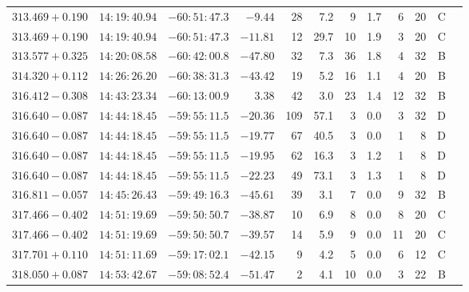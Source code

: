 {\begin{longtable}{c rrr rrrrr rr c}
    $313.469+0.190$     &   $14:19:40.94$     &   $-60:51:47.3$     &   $-9.44   $    &   28     &    7.2    &    9   &   1.7 &   6   &   20  &   C   \\
    $313.469+0.190$     &   $14:19:40.94$     &   $-60:51:47.3$     &   $-11.81  $    &   12     &   29.7    &    10  &   1.9 &   3   &   20  &   C   \\
    $313.577+0.325$     &   $14:20:08.58$     &   $-60:42:00.8$     &   $-47.80  $    &   32     &    7.3    &    36  &   1.8 &   4   &   32  &   B   \\
    $314.320+0.112$     &   $14:26:26.20$     &   $-60:38:31.3$     &   $-43.42  $    &   19     &    5.2    &    16  &   1.1 &   4   &   20  &   B   \\
    $316.412-0.308$     &   $14:43:23.34$     &   $-60:13:00.9$     &   $3.38    $    &   42     &    3.0    &    23  &   1.4 &   12  &   32  &   B   \\
    $316.640-0.087$     &   $14:44:18.45$     &   $-59:55:11.5$     &   $-20.36  $    &   109    &   57.1    &    3   &   0.0 &   3   &   32  &   D   \\
    $316.640-0.087$     &   $14:44:18.45$     &   $-59:55:11.5$     &   $-19.77  $    &   67     &   40.5    &    3   &   0.0 &   1   &   8   &   D   \\
    $316.640-0.087$     &   $14:44:18.45$     &   $-59:55:11.5$     &   $-19.95  $    &   62     &   16.3    &    3   &   1.2 &   1   &   8   &   D   \\
    $316.640-0.087$     &   $14:44:18.45$     &   $-59:55:11.5$     &   $-22.23  $    &   49     &   73.1    &    3   &   1.3 &   1   &   8   &   D   \\
    $316.811-0.057$     &   $14:45:26.43$     &   $-59:49:16.3$     &   $-45.61  $    &   39     &    3.1    &    7   &   0.0 &   9   &   32  &   B   \\
    $317.466-0.402$     &   $14:51:19.69$     &   $-59:50:50.7$     &   $-38.87  $    &   10     &    6.9    &    8   &   0.0 &   8   &   20  &   C   \\
    $317.466-0.402$     &   $14:51:19.69$     &   $-59:50:50.7$     &   $-39.57  $    &   14     &    5.9    &    9   &   0.0 &   11  &   20  &   C   \\
    $317.701+0.110$     &   $14:51:11.69$     &   $-59:17:02.1$     &   $-42.15  $    &   9      &    4.2    &    5   &   0.0 &   6   &   12  &   C   \\
    $318.050+0.087$     &   $14:53:42.67$     &   $-59:08:52.4$     &   $-51.47  $    &   2      &    4.1    &    10  &   0.0 &   3   &   22  &   B   \\

\end{longtable}}

